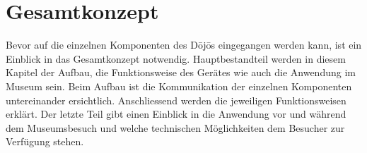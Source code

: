 \section{Gesamtkonzept}\label{sec:gesamtkonzept}
Bevor auf die einzelnen Komponenten des Dōjōs eingegangen werden kann, ist ein Einblick in das Gesamtkonzept notwendig. Hauptbestandteil werden in diesem Kapitel der Aufbau, die Funktionsweise des Gerätes wie auch die Anwendung im Museum sein. Beim Aufbau ist die Kommunikation der einzelnen Komponenten untereinander ersichtlich. Anschliessend werden die jeweiligen Funktionsweisen erklärt. Der letzte Teil gibt einen Einblick in die Anwendung vor und während dem Museumsbesuch und welche technischen Möglichkeiten dem Besucher zur Verfügung stehen.
